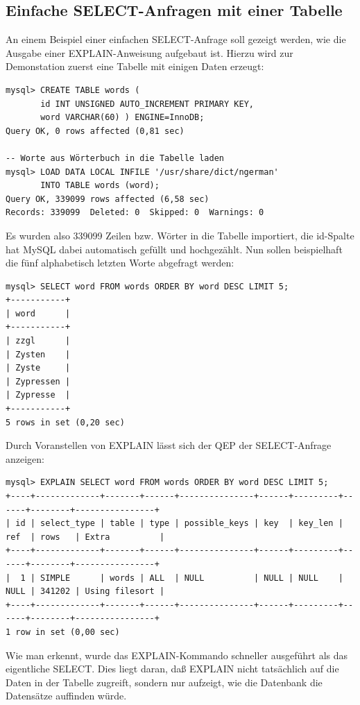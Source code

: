 \subsection{Einfache SELECT-Anfragen mit einer Tabelle}
An einem Beispiel einer einfachen SELECT-Anfrage soll gezeigt werden, wie die Ausgabe einer EXPLAIN-Anweisung aufgebaut ist.
Hierzu wird zur Demonstation zuerst eine Tabelle mit einigen Daten erzeugt:
\begin{lstlisting}
mysql> CREATE TABLE words ( 
       id INT UNSIGNED AUTO_INCREMENT PRIMARY KEY, 
       word VARCHAR(60) ) ENGINE=InnoDB; 
Query OK, 0 rows affected (0,81 sec)

-- Worte aus Wörterbuch in die Tabelle laden
mysql> LOAD DATA LOCAL INFILE '/usr/share/dict/ngerman'
       INTO TABLE words (word);
Query OK, 339099 rows affected (6,58 sec)
Records: 339099  Deleted: 0  Skipped: 0  Warnings: 0
\end{lstlisting}
Es wurden also 339099 Zeilen bzw. Wörter in die Tabelle importiert, die id-Spalte hat MySQL dabei automatisch gefüllt und hochgezählt.
Nun sollen beispielhaft die fünf alphabetisch letzten Worte abgefragt werden:
\begin{lstlisting}
mysql> SELECT word FROM words ORDER BY word DESC LIMIT 5;
+-----------+
| word      |
+-----------+
| zzgl      |
| Zysten    |
| Zyste     |
| Zypressen |
| Zypresse  |
+-----------+
5 rows in set (0,20 sec)
\end{lstlisting}
Durch Voranstellen von EXPLAIN lässt sich der QEP der SELECT-Anfrage anzeigen:
\begin{lstlisting}[basicstyle=\ttfamily\scriptsize]
mysql> EXPLAIN SELECT word FROM words ORDER BY word DESC LIMIT 5;
+----+-------------+-------+------+---------------+------+---------+------+--------+----------------+
| id | select_type | table | type | possible_keys | key  | key_len | ref  | rows   | Extra          |
+----+-------------+-------+------+---------------+------+---------+------+--------+----------------+
|  1 | SIMPLE      | words | ALL  | NULL          | NULL | NULL    | NULL | 341202 | Using filesort |
+----+-------------+-------+------+---------------+------+---------+------+--------+----------------+
1 row in set (0,00 sec)
\end{lstlisting}
Wie man erkennt, wurde das EXPLAIN-Kommando schneller ausgeführt als das eigentliche SELECT.
Dies liegt daran, daß EXPLAIN nicht tatsächlich auf die Daten in der Tabelle zugreift, sondern nur aufzeigt, wie die Datenbank die Datensätze auffinden würde.

